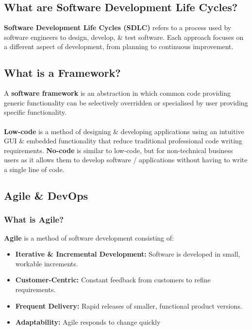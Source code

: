 \documentclass[a4paper,11pt]{article}
\begin{document}
\subsection{What are Software Development Life Cycles?}
\textbf{Software Development Life Cycles (SDLC)} refers to a process used by software engineers to design, develop, \& test software.
Each approach focuses on a different aspect of development, from planning to continuous improvement.

\subsection{What is a Framework?}
A \textbf{software framework} is an abstraction in which common code providing generic functionality can be selectively 
overridden or specialised by user providing specific functionality.
\\\\
\textbf{Low-code} is a method of designing \& developing applications using an intuitive GUI \& embedded functionality that reduce 
traditional professional code writing requirements.
\textbf{No-code} is similar to low-code, but for non-technical business users as it allows them to develop software / applications without
having to write a single line of code.

\subsection{Agile \& DevOps}
\subsubsection{What is Agile?}
\textbf{Agile} is a method of software development consisting of:
\begin{itemize}
    \item   \textbf{Iterative \& Incremental Development:} Software is developed in small, workable increments.
    \item   \textbf{Customer-Centric:} Constant feedback from customers to refine requirements.
    \item   \textbf{Frequent Delivery:} Rapid releases of smaller, functional product versions.
    \item   \textbf{Adaptability:} Agile responds to change quickly
\end{itemize}
\end{document}
